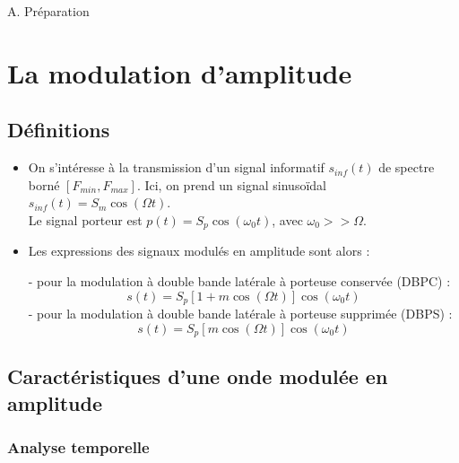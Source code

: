\documentclass[../../Cours_M1.tex]{subfiles}
\title{\nomTD}
\author{\auteur}
\begin{document}
\maketitle

\begin{center}
\begin{Large}
A. Préparation
\end{Large}
\end{center}

\section{La modulation d'amplitude}

\subsection{Définitions}

\begin{itemize}
\item On s'intéresse à la transmission d'un signal informatif $s_{inf}(t)$ de spectre borné $[F_{min},F_{max}]$. Ici, on prend un signal sinusoïdal $s_{inf}(t) = S_m\cos(\Omega t)$. \\

Le signal porteur est $p(t)=S_p\cos(\omega_0 t)$, avec $\omega_0 >> \Omega$.\\

\item Les expressions des signaux modulés en amplitude sont alors :

\begin{multicols}{2}
- pour la modulation à double bande latérale à porteuse conservée (DBPC) :
\[s(t)=S_p[1+m\cos(\Omega t)]\cos(\omega_0 t)\]
- pour la modulation à double bande latérale à porteuse supprimée (DBPS) :
\[s(t)=S_p[m\cos(\Omega t)]\cos(\omega_0 t)\]
\end{multicols}
\end{itemize}

\subsection{Caractéristiques d'une onde modulée en amplitude}

\subsubsection{Analyse temporelle}
\end{document}

